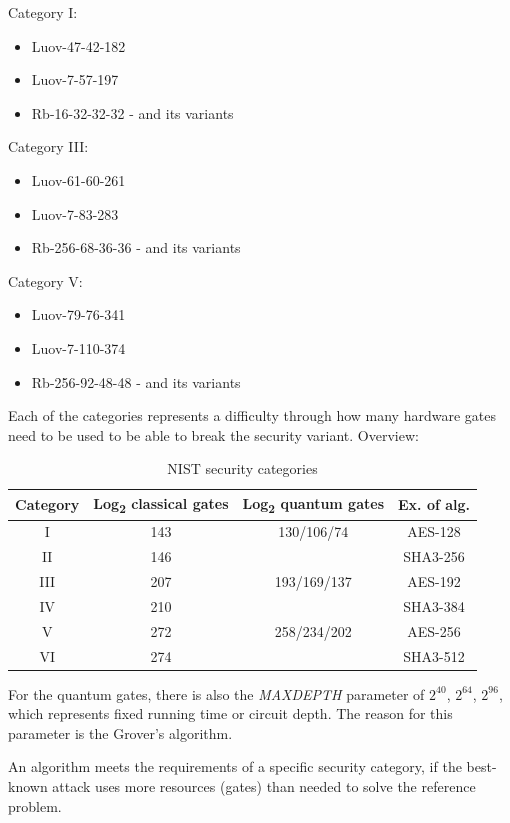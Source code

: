 \documentclass[thesis=M,english]{FITthesis}[2019/12/23]
\begin{document}
\bigskip
\noindent
Category I:
\begin{itemize}
\item Luov-47-42-182
\item Luov-7-57-197
\item Rb-16-32-32-32 - and its variants
\end{itemize}

\noindent
Category III:
\begin{itemize}
\item Luov-61-60-261
\item Luov-7-83-283
\item Rb-256-68-36-36 - and its variants
\end{itemize}

\noindent
Category V:
\begin{itemize}
\item Luov-79-76-341
\item Luov-7-110-374
\item Rb-256-92-48-48 - and its variants
\end{itemize}

\noindent
Each of the categories represents a difficulty through how many hardware gates need to be used to be able to break the security variant.\cite{L-NIST-STANDARD} Overview:
\begin{table}[H]
\centering
\begin{tabular}{|c|c|c|c|}
\hline
Category & Log\textsubscript{2} classical gates & Log\textsubscript{2} quantum gates & Ex. of alg.\\ \hline
I & 143 & 130/106/74 & AES-128 \\ \hline
II & 146 & & SHA3-256 \\ \hline
III & 207 & 193/169/137 & AES-192 \\ \hline
IV & 210 & & SHA3-384 \\ \hline
V & 272 & 258/234/202 & AES-256 \\ \hline
VI & 274 & & SHA3-512 \\ \hline
\end{tabular}
\caption{NIST security categories}
\end{table}

\noindent
For the quantum gates, there is also the \textit{MAXDEPTH} parameter of $2^{40}$, $2^{64}$, $2^{96}$, which represents fixed running time or circuit depth. The reason for this parameter is the Grover’s algorithm.

\bigskip
\noindent
An algorithm meets the requirements of a specific security category, if the best-known attack uses more resources (gates) than needed to solve the reference problem.
\end{document}
